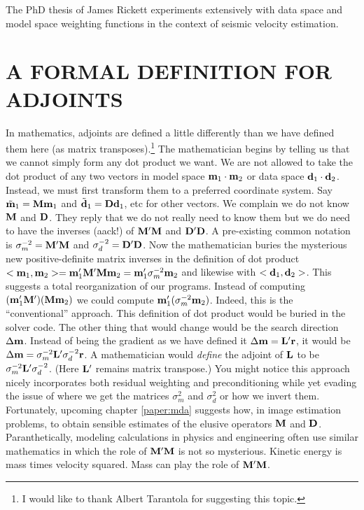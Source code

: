 \par
The PhD thesis of James Rickett experiments extensively
with data space and model space weighting functions
in the context of seismic velocity estimation.


\section{A FORMAL DEFINITION FOR ADJOINTS}

In mathematics, adjoints are defined a little differently than
we have defined them here
(as matrix transposes).\footnote{
	I would like to thank Albert Tarantola for suggesting this topic.
	}
The mathematician begins by telling us that we cannot simply
form any dot product we want.
We are not allowed to take the dot product of any two vectors
in model space
$\bold m_1 \cdot \bold m_2$ or data space
$\bold d_1 \cdot \bold d_2$.
Instead, we must first transform them to a preferred coordinate system.
Say
$\tilde{\bold m}_1 = \bold M \bold m_1$ and
$\tilde{\bold d}_1 = \bold D \bold d_1$, etc for other vectors.
We complain we do not know $\bold M$ and $\bold D$.
They reply that we do not really need to know them
but we do need to have the inverses (aack!) of
$\bold M'\bold M$ and
$\bold D'\bold D$.
A pre-existing common notation is
$\bold\sigma_m^{-2} = \bold M'\bold M$ and
$\bold\sigma_d^{-2} = \bold D'\bold D$.
Now the mathematician buries the mysterious new positive-definite
matrix inverses in the definition of dot product
$<\bold m_1,\bold m_2> = \bold m'_1 \bold M'\bold M \bold m_2 = \bold m'_1 \bold \sigma_m^{-2} \bold m_2$
and likewise with
$<\bold d_1,\bold d_2>$.
This suggests a total reorganization of our programs.
Instead of computing
$(\bold m'_1 \bold M') (\bold M \bold m_2)$
we could compute $\bold m'_1 (\bold\sigma_m^{-2} \bold m_2)$.
Indeed, this is the ``conventional'' approach.
This definition of dot product would be buried in the solver code.
The other thing that would change would be the search direction
$\Delta \bold m$.
Instead of being the gradient as we have defined it
$\Delta \bold m=\bold L'\bold r$,
it would be
$\Delta \bold m=\bold\sigma_m^{-2} \bold L'\bold\sigma_d^{-2}\bold r$.
A mathematician would
{\em define} the adjoint of $\bold L$ to be
$\bold\sigma_m^{-2} \bold L'\bold\sigma_d^{-2}$.
(Here $\bold L'$ remains matrix transpose.)
You might notice this approach nicely incorporates
both residual weighting and preconditioning
while yet evading the issue of where we get the matrices
$\sigma_m^2$ and $\sigma_d^2$ or how we invert them.
Fortunately, upcoming chapter \ref{paper:mda}
suggests how,
in image estimation problems,
to obtain sensible estimates of the elusive operators $\bold M$ and $\bold D$.
Paranthetically, modeling calculations in physics and engineering
often use similar mathematics
in which the role of $\bold M'\bold M$ is not so mysterious.
Kinetic energy is mass times velocity squared.
Mass can play the role of $\bold M'\bold M$.

